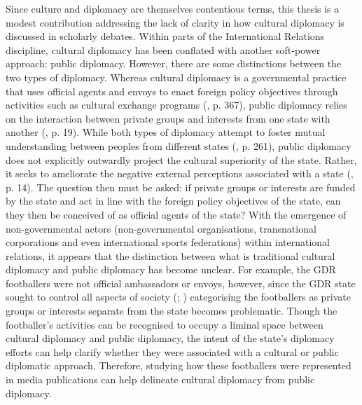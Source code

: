Since culture and diplomacy are themselves contentious terms, this thesis is a modest contribution addressing the lack of clarity in how cultural diplomacy is discussed in scholarly debates. Within parts of the International Relations discipline, cultural diplomacy has been conflated with another soft-power approach: public diplomacy. However, there are some distinctions between the two types of diplomacy. Whereas cultural diplomacy is a governmental practice that uses official agents and envoys to enact foreign policy objectives through activities such as cultural exchange programs (\cite{ang2015}, p. 367), public diplomacy relies on the interaction between private groups and interests from one state with another (\cite{cull2008b}, p. 19). While both types of diplomacy attempt to foster mutual understanding between peoples from different states (\cite{hartig2016}, p. 261), public diplomacy does not explicitly outwardly project the cultural superiority of the state. Rather, it seeks to ameliorate the negative external perceptions associated with a state (\cite{melissen2011}, p. 14). The question then must be asked: if private groups or interests are funded by the state and act in line with the foreign policy objectives of the state, can they then be conceived of as official agents of the state? With the emergence of non-governmental actors (non-governmental organisations, transnational corporations and even international sports federations) within international relations, it appears that the distinction between what is traditional cultural diplomacy and public diplomacy has become unclear. For example, the GDR footballers were not official ambassadors or envoys, however, since the GDR state sought to control all aspects of society (\cite{fullbrook1995}; \cite{dennis2000}) categorising the footballers as private groups or interests separate from the state becomes problematic. Though the footballer’s activities can be recognised to occupy a liminal space between cultural diplomacy and public diplomacy, the intent of the state’s diplomacy efforts can help clarify whether they were associated with a cultural or public diplomatic approach. Therefore, studying how these footballers were represented in media publications can help delineate cultural diplomacy from public diplomacy.

